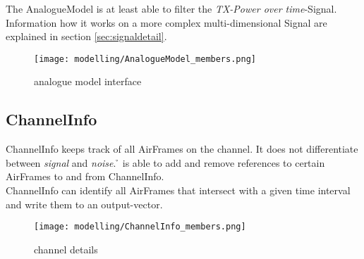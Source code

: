 %

The AnalogueModel is at least able to filter the \emph{TX-Power over
time}-Signal.\\

Information how it works on a more complex multi-dimensional Signal are
explained in section \ref{sec:signaldetail}.
 
\begin{figure}[H]
 \centering
 \texttt{[image: modelling/AnalogueModel\_members.png]}
 \caption{analogue model interface}
 \label{fig: analogue model interface}
\end{figure}
%





\subsection{ChannelInfo}

ChannelInfo keeps track of all AirFrames on the channel. It does not
differentiate between \textit{signal} and \textit{noise}. \h{\bp} is able to
add and remove references to certain AirFrames to and from ChannelInfo.\\
ChannelInfo can identify all AirFrames that intersect with a
given time interval and write them to an output-vector.

\begin{figure}[H]
 \centering
 \texttt{[image: modelling/ChannelInfo\_members.png]}
 \caption{channel details}
 \label{fig: channel details}
\end{figure}
